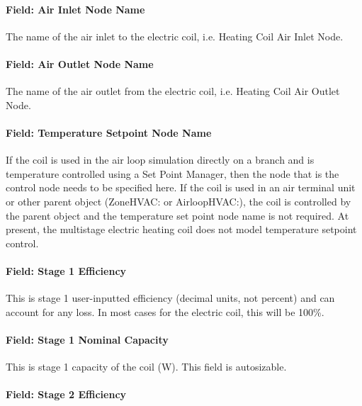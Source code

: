 \paragraph{Field: Air Inlet Node Name}\label{field-air-inlet-node-name-4-001}

The name of the air inlet to the electric coil, i.e. Heating Coil Air Inlet Node.

\paragraph{Field: Air Outlet Node Name}\label{field-air-outlet-node-name-4-001}

The name of the air outlet from the electric coil, i.e. Heating Coil Air Outlet Node.

\paragraph{Field: Temperature Setpoint Node Name}\label{field-temperature-setpoint-node-name-2}

If the coil is used in the air loop simulation directly on a branch and is temperature controlled using a Set Point Manager, then the node that is the control node needs to be specified here. If the coil is used in an air terminal unit or other parent object (ZoneHVAC: or AirloopHVAC:), the coil is controlled by the parent object and the temperature set point node name is not required. At present, the multistage electric heating coil does not model temperature setpoint control.

\paragraph{Field: Stage 1 Efficiency}\label{field-stage-1-efficiency}

This is stage 1 user-inputted efficiency (decimal units, not percent) and can account for any loss. In most cases for the electric coil, this will be 100\%.

\paragraph{Field: Stage 1 Nominal Capacity}\label{field-stage-1-nominal-capacity}

This is stage 1 capacity of the coil (W). This field is autosizable.

\paragraph{Field: Stage 2 Efficiency}\label{field-stage-2-efficiency}

